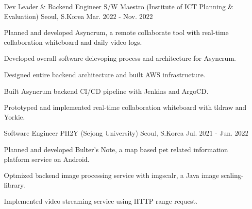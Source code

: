 \begin{cventries}
  \cventry
    {Dev Leader \& Backend Engineer} %
    {S/W Maestro (Institute of ICT Planning \& Evaluation)} %
    {Seoul, S.Korea} %
    {Mar. 2022 - Nov. 2022} %
    {
      \begin{cvitems} %
        \item {Planned and developed Asyncrum, a remote collaborate tool with real-time collaboration whiteboard and daily video logs.}
        \item {Developed overall software delevoping process and architecture for Asyncrum.}
        \item {Designed entire backend architecture and built AWS infrastructure.}
        \item {Built Asyncrum backend CI/CD pipeline with Jenkins and ArgoCD.}
        \item {Prototyped and implemented real-time collaboration whiteboard with tldraw and Yorkie.}        
      \end{cvitems}
    }

  \cventry
    {Software Engineer} %
    {PH2Y (Sejong University)} %
    {Seoul, S.Korea} %
    {Jul. 2021 - Jun. 2022} %
    {
      \begin{cvitems} %
        \item {Planned and developed Bulter's Note, a map based pet related information platform service on Android.}
        \item {Optmized backend image processing service with imgscalr, a Java image scaling-library.}
        \item {Implemented video streaming service using HTTP range request.}
      \end{cvitems}
    }


\end{cventries}
